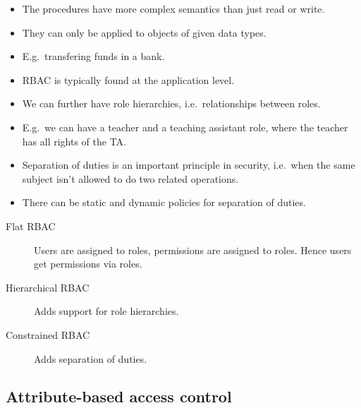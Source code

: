 \documentclass{beamer}
\begin{document}
\begin{frame}
  \begin{itemize}
    \item The procedures have more complex semantics than just read or write.

    \item They can only be applied to objects of given data types.

    \item E.g.\ transfering funds in a bank.

    \item RBAC is typically found at the application level.
  \end{itemize}
\end{frame}

\begin{frame}
  \begin{itemize}
    \item We can further have role hierarchies, i.e.\ relationships between 
      roles.

    \item E.g.\ we can have a teacher and a teaching assistant role, where the 
      teacher has all rights of the TA\@.

    \item Separation of duties is an important principle in security, i.e.\ 
      when the same subject isn't allowed to do two related operations.

    \item There can be static and dynamic policies for separation of duties.

  \end{itemize}
\end{frame}

\begin{frame}
  \begin{description}
    \item[Flat RBAC] Users are assigned to roles, permissions are assigned to 
      roles.
      Hence users get permissions via roles.

    \item[Hierarchical RBAC]
      Adds support for role hierarchies.

    \item[Constrained RBAC]
      Adds separation of duties.
  \end{description}
\end{frame}

\subsection{Attribute-based access control}
\end{document}
